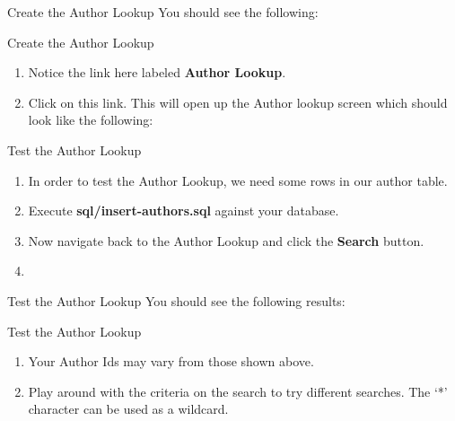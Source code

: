 \documentclass[xcolor=dvipsnames,14pt,professionalfonts]{beamer}
\begin{document}
\begin{frame}{Create the Author Lookup}
  You should see the following:
\end{frame}

\begin{frame}{Create the Author Lookup}
  \begin{enumerate}
    \item Notice the link here labeled \textbf{Author Lookup}.  
    \item Click on this link. This will open up the Author lookup screen which should look like the following:
    \end{enumerate}
  \end{frame}

  \begin{frame}{Test the Author Lookup}
    \begin{enumerate}
    \item In order to test the Author Lookup, we need some rows in our author table.
      \item Execute \textbf{sql/insert-authors.sql} against your database.
      \item Now navigate back to the Author Lookup and click the
        \textbf{Search} button.
      \item 
      \end{enumerate}
    \end{frame}
    
    \begin{frame}{Test the Author Lookup}
      You should see the following results:
    \end{frame}
    
    \begin{frame}{Test the Author Lookup}
      \begin{enumerate}
      \item Your Author Ids may vary from those shown above.
      \item Play around with the criteria on the search to try
        different searches.  The ‘*’ character can be used as a
        wildcard.
      \end{enumerate}
    \end{frame}
\end{document}
